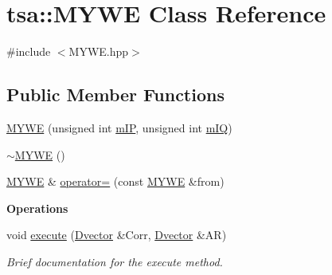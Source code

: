 \hypertarget{classtsa_1_1_m_y_w_e}{}\section{tsa\+:\+:M\+Y\+WE Class Reference}
\label{classtsa_1_1_m_y_w_e}


{\ttfamily \#include $<$M\+Y\+W\+E.\+hpp$>$}

\subsection*{Public Member Functions}
\begin{DoxyCompactItemize}
\item 
\hyperlink{classtsa_1_1_m_y_w_e_a600550470fe4832dfd450a7aa60ad36b}{M\+Y\+WE} (unsigned int \hyperlink{classtsa_1_1_m_y_w_e_aefdc7e987eddb2a34daad521dd501840}{m\+IP}, unsigned int \hyperlink{classtsa_1_1_m_y_w_e_a7ad6499007931fab78ffa0300b0c21a5}{m\+IQ})
\item 
\hyperlink{classtsa_1_1_m_y_w_e_a1bfa6dd78320a8606653346e2125e96a}{$\sim$\+M\+Y\+WE} ()
\item 
\hyperlink{classtsa_1_1_m_y_w_e}{M\+Y\+WE} \& \hyperlink{classtsa_1_1_m_y_w_e_aaa9191158d3202f9e4e734724e9eaf98}{operator=} (const \hyperlink{classtsa_1_1_m_y_w_e}{M\+Y\+WE} \&from)
\end{DoxyCompactItemize}
\begin{Indent}\textbf{ Operations}\par
\begin{DoxyCompactItemize}
\item 
void \hyperlink{classtsa_1_1_m_y_w_e_a61f62c0f6070ccbfce9bd7edc137bf33}{execute} (\hyperlink{namespacetsa_a8900fb03d849baf447a1a0efe2561fb2}{Dvector} \&Corr, \hyperlink{namespacetsa_a8900fb03d849baf447a1a0efe2561fb2}{Dvector} \&AR)
\begin{DoxyCompactList}\small\item\em Brief documentation for the execute method. \end{DoxyCompactList}\end{DoxyCompactItemize}
\end{Indent}
